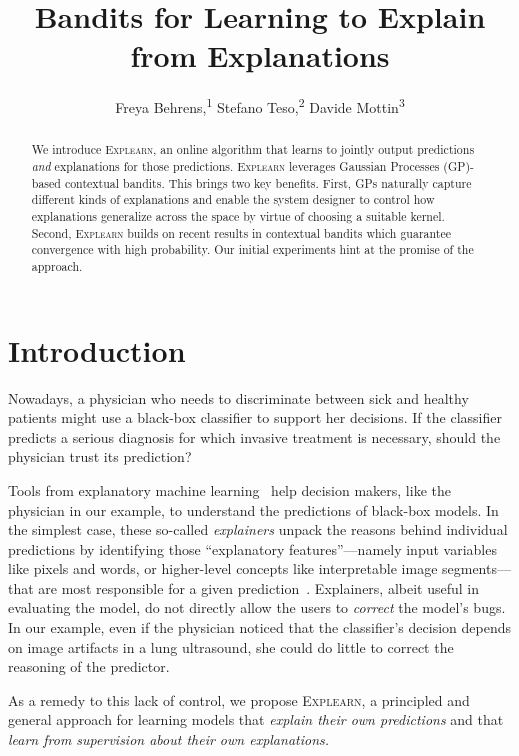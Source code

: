 \documentclass[letterpaper]{article} %
\title{Bandits for Learning to Explain from Explanations}
\author {
    Freya Behrens,\textsuperscript{\rm 1}
    Stefano Teso,\textsuperscript{\rm 2}
    Davide Mottin\textsuperscript{\rm 3} \\
}
\newcommand{\explearn}{\textsc{Explearn}\xspace}
\begin{document}
\maketitle


\begin{abstract}
    We introduce \explearn, an online algorithm that learns to jointly output predictions \emph{and} explanations for those predictions.
    \explearn leverages Gaussian Processes (GP)-based contextual bandits.
    This brings two key benefits.
    First, GPs naturally capture different kinds of explanations and enable the system designer to control how explanations generalize across the space by virtue of choosing a suitable kernel.
    Second, \explearn builds on recent results in contextual bandits which guarantee convergence with high probability.
    Our initial experiments hint at the promise of the approach.
\end{abstract}


\section{Introduction}
\label{sec:introduction}

Nowadays, a physician who needs to discriminate between sick and healthy patients might use a black-box classifier to support her decisions.  If the classifier predicts a serious diagnosis for which invasive treatment is necessary, should the physician trust its prediction?

Tools from explanatory machine learning~\cite{guidotti2018survey} help decision makers, like the physician in our example, to understand the predictions of black-box models.  In the simplest case, these so-called \emph{explainers} unpack the reasons behind individual predictions by identifying those ``explanatory features''---namely input variables like pixels and words, or higher-level concepts like interpretable image segments---that are most responsible for a given prediction~\cite{guidotti2018local}.  
Explainers, albeit useful in evaluating the model, do not directly allow the users to \emph{correct} the model's bugs.  In our example, even if the physician noticed that the classifier's decision depends on image artifacts in a lung ultrasound, she could do little to correct the reasoning of the predictor.

As a remedy to this lack of control, we propose \explearn, a principled and general approach for learning models that \emph{explain their own predictions} and that \emph{learn from supervision about their own explanations.}
\end{document}
